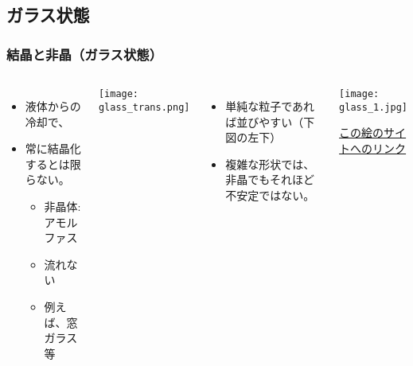\documentclass[12pt, dvipdfmx]{beamer}
\begin{document}
\subsection{ガラス状態}
\begin{frame}
	\frametitle{結晶と非晶（ガラス状態）}
	\begin{columns}[T, onlytextwidth]
			\begin{itemize}
				\item 液体からの冷却で、
				\item 常に結晶化するとは限らない。
				\begin{itemize}
					\item 非晶体:アモルファス
					\item 流れない
					\item 例えば、窓ガラス等
				\end{itemize}
			\end{itemize}
			\begin{center}
				\texttt{[image: glass\_trans.png]}
			\end{center}
			\begin{itemize}
				\item 単純な粒子であれば並びやすい（下図の左下）
				\item 複雑な形状では、非晶でもそれほど不安定ではない。
			\end{itemize}
			\begin{center}
				\texttt{[image: glass\_1.jpg]}

				\href{https://hr-inoue.net/zscience/topics/glass/glass.html}{\small{この絵のサイトへのリンク}}
			\end{center}
	\end{columns}
\end{frame}
\end{document}
